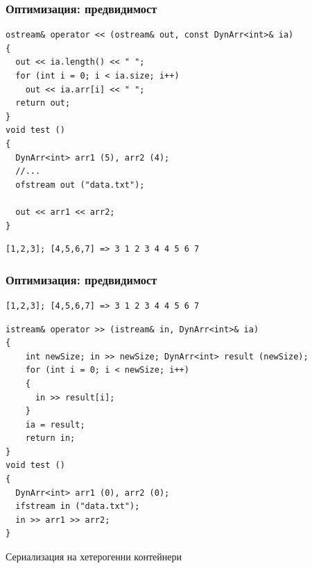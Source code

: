 \documentclass{beamer}
\begin{document}
\begin{frame}[fragile]
\frametitle{Оптимизация: предвидимост}


\begin{flushleft}
\begin{lstlisting}
ostream& operator << (ostream& out, const DynArr<int>& ia)
{
  out << ia.length() << " ";
  for (int i = 0; i < ia.size; i++)
    out << ia.arr[i] << " ";
  return out;
}
void test ()
{
  DynArr<int> arr1 (5), arr2 (4);
  //...
  ofstream out ("data.txt");

  out << arr1 << arr2;
}
\end{lstlisting}
\end{flushleft}

\begin{lstlisting}
[1,2,3]; [4,5,6,7] => 3 1 2 3 4 4 5 6 7
\end{lstlisting}

\end{frame}




\begin{frame}[fragile]
\frametitle{Оптимизация: предвидимост}

\begin{lstlisting}
[1,2,3]; [4,5,6,7] => 3 1 2 3 4 4 5 6 7
\end{lstlisting}

\begin{flushleft}
\begin{lstlisting}
istream& operator >> (istream& in, DynArr<int>& ia)
{
    int newSize; in >> newSize; DynArr<int> result (newSize);
    for (int i = 0; i < newSize; i++)
    {
      in >> result[i];
    }
    ia = result;
    return in;
}
void test ()
{
  DynArr<int> arr1 (0), arr2 (0);
  ifstream in ("data.txt");
  in >> arr1 >> arr2;
}
\end{lstlisting}
\end{flushleft}


\end{frame}


\begin{frame}
\centerline{Сериализация на хетерогенни контейнери}
\end{frame}
\end{document}
